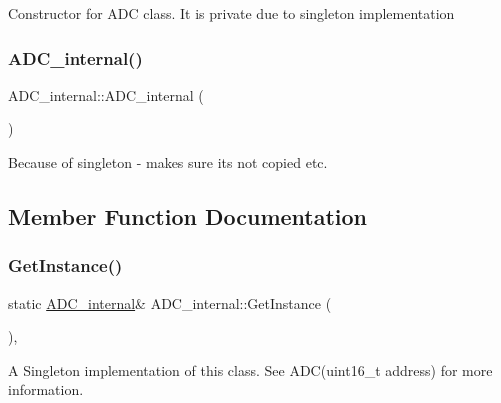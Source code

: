 Constructor for A\+DC class. It is private due to singleton implementation \hypertarget{class_a_d_c__internal_a7ae0c6415d603f8e4b86c735d4d235f5}{}\label{class_a_d_c__internal_a7ae0c6415d603f8e4b86c735d4d235f5} 
\subsubsection{\texorpdfstring{A\+D\+C\+\_\+internal()}{ADC\_internal()}\hspace{0.1cm}{\footnotesize\ttfamily [2/2]}}
{\footnotesize\ttfamily A\+D\+C\+\_\+internal\+::\+A\+D\+C\+\_\+internal (\begin{DoxyParamCaption}\item[{const \hyperlink{class_a_d_c__internal}{A\+D\+C\+\_\+internal} \&}]{ }\end{DoxyParamCaption})\hspace{0.3cm}{\ttfamily [delete]}}

Because of singleton -\/ makes sure its not copied etc. 

\subsection{Member Function Documentation}
\hypertarget{class_a_d_c__internal_aebcca86ecf84a34cbbb0994b4defc692}{}\label{class_a_d_c__internal_aebcca86ecf84a34cbbb0994b4defc692} 
\subsubsection{\texorpdfstring{Get\+Instance()}{GetInstance()}}
{\footnotesize\ttfamily static \hyperlink{class_a_d_c__internal}{A\+D\+C\+\_\+internal}\& A\+D\+C\+\_\+internal\+::\+Get\+Instance (\begin{DoxyParamCaption}{ }\end{DoxyParamCaption})\hspace{0.3cm}{\ttfamily [inline]}, {\ttfamily [static]}}

A Singleton implementation of this class. See A\+D\+C(uint16\+\_\+t address) for more information. \hypertarget{class_a_d_c__internal_a07f6b3f9703f2a5f6815904e371bb124}{}\label{class_a_d_c__internal_a07f6b3f9703f2a5f6815904e371bb124} 
